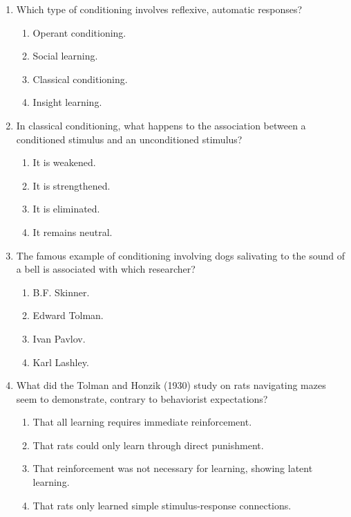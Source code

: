 \documentclass{article}
\begin{document}
\begin{enumerate}[label=\arabic*.]
\item Which type of conditioning involves reflexive, automatic responses?
\begin{enumerate}[label=(\alph*)]
    \item Operant conditioning.
    \item Social learning.
    \item Classical conditioning.
    \item Insight learning.
\end{enumerate}

\item In classical conditioning, what happens to the association between a conditioned stimulus and an unconditioned stimulus?
\begin{enumerate}[label=(\alph*)]
    \item It is weakened.
    \item It is strengthened.
    \item It is eliminated.
    \item It remains neutral.
\end{enumerate}

\item The famous example of conditioning involving dogs salivating to the sound of a bell is associated with which researcher?
\begin{enumerate}[label=(\alph*)]
    \item B.F. Skinner.
    \item Edward Tolman.
    \item Ivan Pavlov.
    \item Karl Lashley.
\end{enumerate}

\item What did the Tolman and Honzik (1930) study on rats navigating mazes seem to demonstrate, contrary to behaviorist expectations?
\begin{enumerate}[label=(\alph*)]
    \item That all learning requires immediate reinforcement.
    \item That rats could only learn through direct punishment.
    \item That reinforcement was not necessary for learning, showing latent learning.
    \item That rats only learned simple stimulus-response connections.
\end{enumerate}


\end{enumerate}
\end{document}
